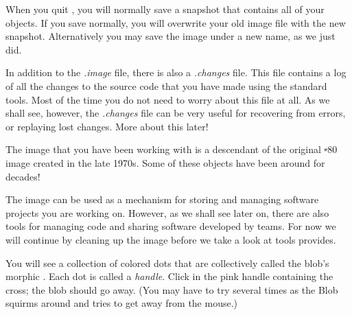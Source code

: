 \documentclass[a4paper,10pt,twoside]{book}
\begin{document}
When you quit \sq, you will normally save a snapshot that contains all of your objects.  If you save normally, you will overwrite your old image file with the new snapshot. Alternatively you may save the image under a new name, as we just did.

In addition to the \emph{.image} file, there is also a \emph{.changes} file.
This file contains a log of all the changes to the source code that you have made using the standard tools.
Most of the time you do not need to worry about this file at all.
As we shall see, however, the \emph{.changes} file can be very useful for recovering from errors, or replaying lost changes.
More about this later!

The image that you have been working with is a descendant of the original \st-80 image created in the late 1970s.
Some of these objects have been around for decades!

The image can be used as a mechanism for storing and managing software projects you are working on.
However, as we shall see later on, there are also tools for managing code and sharing software developed by teams.
For now we will continue by cleaning up the image before we take a look at tools \sq provides.

You will see a collection of colored dots that are collectively called the blob's morphic .
Each dot is called a \emph{handle}.
Click in the pink handle containing the cross; the blob should go away. 
(You may have to try several times as the Blob squirms around and tries to get away from the mouse.)
\end{document}
